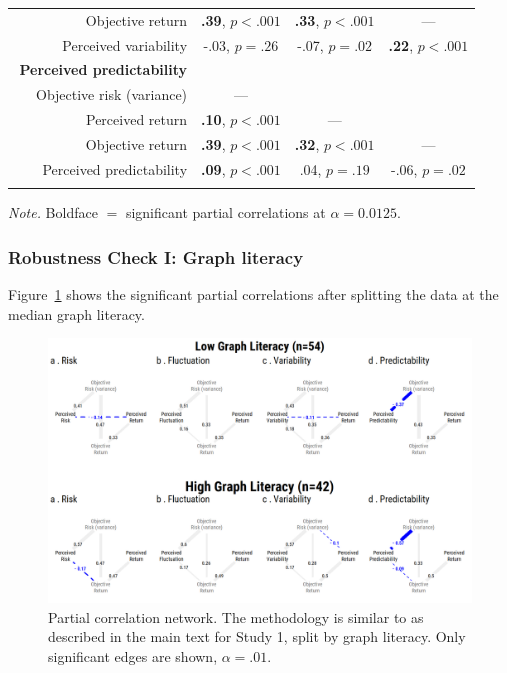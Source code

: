 \begin{table}[H]
\begin{center}
\begin{threeparttable}
\begin{tabular}{rccc}
\ \ \ Objective return & \textbf{.39}, $p<.001$ & \textbf{.33}, $p<.001$ & ---\\
\ \ \ Perceived variability & -.03, $ p= .26 $ & -.07, $ p= .02 $ & \textbf{.22}, $p<.001$\\
\cmidrule{2-4} \textbf{ Perceived predictability } &  &  & \\
\ \ \ Objective risk (variance) & --- &  & \\
\ \ \ Perceived return & \textbf{.10}, $p<.001$ & --- & \\
\ \ \ Objective return & \textbf{.39}, $p<.001$ & \textbf{.32}, $p<.001$ & ---\\
\ \ \ Perceived predictability & \textbf{.09}, $p<.001$ & .04, $ p= .19 $ & -.06, $ p= .02 $\\
\bottomrule
\addlinespace
\end{tabular}
\begin{tablenotes}[para]
\normalsize{\textit{Note.} Boldface $=$ significant partial correlations at $\alpha= 0.0125 $.}
\end{tablenotes}
\end{threeparttable}
\end{center}
\end{table}

\newpage
\subsubsection{Robustness Check I: Graph literacy}
Figure~\ref{fig:study1_pcor_by_glit} shows the significant partial correlations after splitting the data at the median graph literacy.
\begin{figure}[H] 
 \centering
 \includegraphics[width=.8\linewidth, keepaspectratio]{sfig1.png} 
 \caption{Partial correlation network. The methodology is similar to as described in the main text for Study 1, split by graph literacy. Only significant edges are shown, $\alpha=.01$.}
 \label{fig:study1_pcor_by_glit}
\end{figure}

